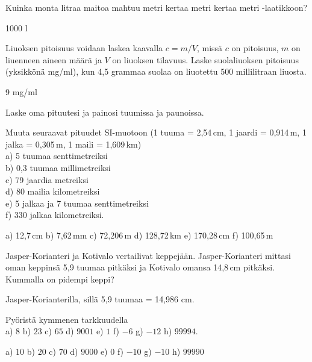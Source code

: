 \begin{tehtavasivu}
\begin{tehtava}
Kuinka monta litraa maitoa mahtuu metri kertaa metri kertaa metri -laatikkoon?
	\begin{vastaus}
	1000 l
	\end{vastaus}
\end{tehtava}

\begin{tehtava}
Liuoksen pitoisuus voidaan laskea kaavalla $c=m/V$, missä $c$ on pitoisuus, $m$ on liuenneen aineen määrä ja $V$ on liuoksen tilavuus.
Laske suolaliuoksen pitoisuus (yksikkönä mg/ml), kun 4,5 grammaa suolaa on liuotettu 500 millilitraan liuosta.
\begin{vastaus}
9 mg/ml
\end{vastaus}
\end{tehtava}

\begin{tehtava}
Laske oma pituutesi ja painosi tuumissa ja paunoissa.
\end{tehtava}

\begin{tehtava}
Muuta seuraavat pituudet SI-muotoon (1 tuuma = 2,54\,cm, 1 jaardi = 0,914\,m, 1 jalka = 0,305\,m, 1 maili = 1,609\,km) \\
a) 5 tuumaa senttimetreiksi \\
b) 0,3 tuumaa millimetreiksi \\
c) 79 jaardia metreiksi \\
d) 80 mailia kilometreiksi \\
e) 5 jalkaa ja 7 tuumaa senttimetreiksi \\
f) 330 jalkaa kilometreiksi.
\begin{vastaus}
a) 12,7\,cm \qquad
b) 7,62\,mm \qquad
c) 72,206\,m \qquad
d) 128,72\,km \qquad
e) 170,28\,cm \qquad
f) 100,65\,m
\end{vastaus}
\end{tehtava}

\begin{tehtava}
Jasper-Korianteri ja Kotivalo vertailivat keppejään. Jasper-Korianteri mittasi oman keppinsä 5,9 tuumaa pitkäksi ja Kotivalo omansa 14,8\,cm pitkäksi. Kummalla on pidempi keppi?
\begin{vastaus}
Jasper-Korianterilla, sillä 5,9 tuumaa = 14,986 cm.
\end{vastaus}
\end{tehtava}

\begin{tehtava}
Pyöristä kymmenen tarkkuudella \\
a) $8$ \qquad
b) $23$ \qquad
c) $65$ \qquad
d) $9001$ \qquad
e) $1$ \qquad
f) $-6$ \qquad
g) $-12$ \qquad
h) $99994$.
\begin{vastaus}
a) $10$ \qquad
b) $20$ \qquad
c) $70$ \qquad
d) $9000$ \qquad
e) $0$ \qquad
f) $-10$ \qquad
g) $-10$ \qquad
h) $99990$
\end{vastaus}
\end{tehtava}


\end{tehtavasivu}
